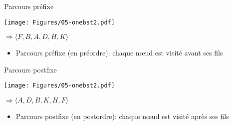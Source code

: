\begin{frame}{Parcours préfixe}

\begin{center}
\texttt{[image: Figures/05-onebst2.pdf]}
\bigskip

$\Rightarrow \langle F, B, A, D, H, K\rangle$
\end{center}

\begin{itemize}
\item Parcours préfixe (en préordre): chaque n\oe ud est visité \alert{avant} ses fils

\bigskip
\begin{center}
\begin{small}
\end{small}
\end{center}

\end{itemize}

\end{frame}

\begin{frame}{Parcours postfixe}

\begin{center}
\texttt{[image: Figures/05-onebst2.pdf]}
\bigskip

$\Rightarrow \langle A, D, B, K, H, F\rangle$
\end{center}

\begin{itemize}
\item Parcours postfixe (en postordre): chaque n\oe ud est visité \alert{après} ses fils

\bigskip
\begin{center}
\begin{small}
\end{small}
\end{center}

\end{itemize}

\end{frame}

